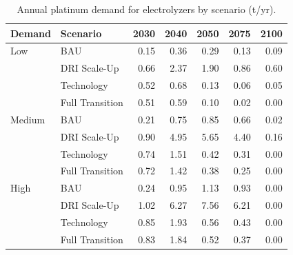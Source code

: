 \begin{table}[h!]
\centering
\small
\caption{Annual platinum demand for electrolyzers by scenario (t/yr).}
\label{tab:app_platinum}
\begin{tabular}{llrrrrr}
\toprule
Demand & Scenario & 2030 & 2040 & 2050 & 2075 & 2100 \\
\midrule
Low & BAU & 0.15 & 0.36 & 0.29 & 0.13 & 0.09 \\
 & DRI Scale-Up & 0.66 & 2.37 & 1.90 & 0.86 & 0.60 \\
 & Technology & 0.52 & 0.68 & 0.13 & 0.06 & 0.05 \\
 & Full Transition & 0.51 & 0.59 & 0.10 & 0.02 & 0.00 \\
\midrule
Medium & BAU & 0.21 & 0.75 & 0.85 & 0.66 & 0.02 \\
 & DRI Scale-Up & 0.90 & 4.95 & 5.65 & 4.40 & 0.16 \\
 & Technology & 0.74 & 1.51 & 0.42 & 0.31 & 0.00 \\
 & Full Transition & 0.72 & 1.42 & 0.38 & 0.25 & 0.00 \\
\midrule
High & BAU & 0.24 & 0.95 & 1.13 & 0.93 & 0.00 \\
 & DRI Scale-Up & 1.02 & 6.27 & 7.56 & 6.21 & 0.00 \\
 & Technology & 0.85 & 1.93 & 0.56 & 0.43 & 0.00 \\
 & Full Transition & 0.83 & 1.84 & 0.52 & 0.37 & 0.00 \\
\bottomrule
\end{tabular}
\end{table}
